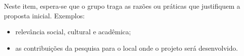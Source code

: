 Neste item, espera-se que o grupo traga as razões ou práticas que justifiquem a
proposta inicial. Exemplos:

\begin{itemize}
    \item relevância social, cultural e acadêmica;
    \item as contribuições da pesquisa para o local onde o projeto será desenvolvido.
\end{itemize}